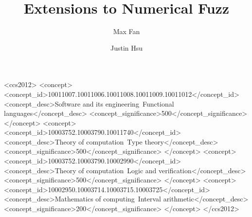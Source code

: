 \documentclass[acmsmall, review]{acmart}
\begin{document}
\title{Extensions to Numerical Fuzz}

\author{Max Fan}

\author{Justin Hsu}

\renewcommand{\shortauthors}{Fan and Hsu}

\begin{abstract}
\end{abstract}

\begin{CCSXML}
<ccs2012>
<concept>
<concept_id>10011007.10011006.10011008.10011009.10011012</concept_id>
<concept_desc>Software and its engineering~Functional languages</concept_desc>
<concept_significance>500</concept_significance>
</concept>
<concept>
<concept_id>10003752.10003790.10011740</concept_id>
<concept_desc>Theory of computation~Type theory</concept_desc>
<concept_significance>500</concept_significance>
</concept>
<concept>
<concept_id>10003752.10003790.10002990</concept_id>
<concept_desc>Theory of computation~Logic and verification</concept_desc>
<concept_significance>500</concept_significance>
</concept>
<concept>
<concept_id>10002950.10003714.10003715.10003725</concept_id>
<concept_desc>Mathematics of computing~Interval arithmetic</concept_desc>
<concept_significance>200</concept_significance>
</concept>
</ccs2012>
\end{CCSXML}
\end{document}
